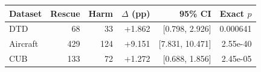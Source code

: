 \begin{tabular}{lrrrrr}
\toprule
Dataset & Rescue & Harm & $\Delta$ (pp) & 95\% CI & Exact $p$ \\
\midrule
DTD & 68 & 33 & +1.862 & [0.798, 2.926] & 0.000641 \\
Aircraft & 429 & 124 & +9.151 & [7.831, 10.471] & 2.55e-40 \\
CUB & 133 & 72 & +1.272 & [0.688, 1.856] & 2.45e-05 \\
\bottomrule
\end{tabular}
